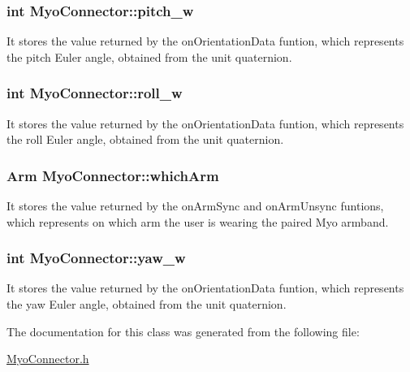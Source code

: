 \subsubsection[{\texorpdfstring{pitch\+\_\+w}{pitch_w}}]{\setlength{\rightskip}{0pt plus 5cm}int Myo\+Connector\+::pitch\+\_\+w\hspace{0.3cm}{\ttfamily [private]}}\hypertarget{classMyoConnector_a9005025e75f04acef5f587b2315b0f5c}{}\label{classMyoConnector_a9005025e75f04acef5f587b2315b0f5c}
It stores the value returned by the on\+Orientation\+Data funtion, which represents the pitch Euler angle, obtained from the unit quaternion. 
\subsubsection[{\texorpdfstring{roll\+\_\+w}{roll_w}}]{\setlength{\rightskip}{0pt plus 5cm}int Myo\+Connector\+::roll\+\_\+w\hspace{0.3cm}{\ttfamily [private]}}\hypertarget{classMyoConnector_a373d10d0e950eeed40e9f31299c92dac}{}\label{classMyoConnector_a373d10d0e950eeed40e9f31299c92dac}
It stores the value returned by the on\+Orientation\+Data funtion, which represents the roll Euler angle, obtained from the unit quaternion. 
\subsubsection[{\texorpdfstring{which\+Arm}{whichArm}}]{\setlength{\rightskip}{0pt plus 5cm}Arm Myo\+Connector\+::which\+Arm\hspace{0.3cm}{\ttfamily [private]}}\hypertarget{classMyoConnector_aa4054bb7438f07bf8109d54fc8be3f58}{}\label{classMyoConnector_aa4054bb7438f07bf8109d54fc8be3f58}
It stores the value returned by the on\+Arm\+Sync and on\+Arm\+Unsync funtions, which represents on which arm the user is wearing the paired Myo armband. 
\subsubsection[{\texorpdfstring{yaw\+\_\+w}{yaw_w}}]{\setlength{\rightskip}{0pt plus 5cm}int Myo\+Connector\+::yaw\+\_\+w\hspace{0.3cm}{\ttfamily [private]}}\hypertarget{classMyoConnector_a1ed4453c60238a7eca696500cb1d2c4e}{}\label{classMyoConnector_a1ed4453c60238a7eca696500cb1d2c4e}
It stores the value returned by the on\+Orientation\+Data funtion, which represents the yaw Euler angle, obtained from the unit quaternion. 

The documentation for this class was generated from the following file\+:\begin{DoxyCompactItemize}
\item 
\hyperlink{MyoConnector_8h}{Myo\+Connector.\+h}\end{DoxyCompactItemize}
